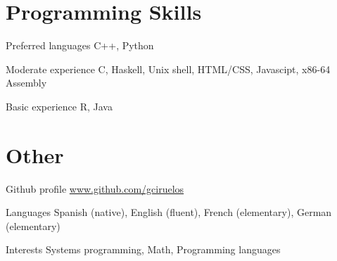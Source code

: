 \documentclass[a4paper,english,10pt]{article}
\begin{document}
\section{Programming Skills}
\begin{CV}
\item[Preferred languages] \hspace{1.2em} C++, Python
\item[Moderate experience] \hspace{0.7em} C, Haskell, Unix shell, HTML/CSS, Javascipt, x86-64 Assembly
\item[Basic experience]  \hspace{2.4em} R, Java
\end{CV}


\section{Other}
\begin{CV}
\item[Github profile] \href{http://www.github.com/gciruelos}{www.github.com/gciruelos}
\item[Languages] Spanish (native), English (fluent), French (elementary), German (elementary)
\item[Interests] Systems programming, Math, Programming languages
\end{CV}
\end{document}
